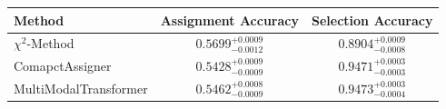     \begin{tabular}{lcc}
        \toprule
        Method & Assignment Accuracy & Selection Accuracy \\
        \midrule
        $\chi^2$-Method & $0.5699^{+0.0009}_{-0.0012}$ & $0.8904^{+0.0009}_{-0.0008}$ \\
        ComapctAssigner & $0.5428^{+0.0009}_{-0.0009}$ & $0.9471^{+0.0003}_{-0.0003}$ \\
        MultiModalTransformer & $0.5462^{+0.0008}_{-0.0009}$ & $0.9473^{+0.0003}_{-0.0004}$ \\
        \bottomrule
    \end{tabular}